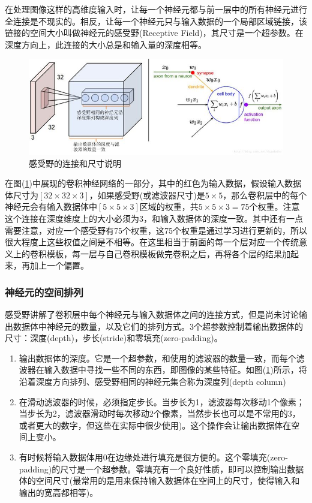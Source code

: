 \documentclass[UTF-8, a4paper, 12pt]{ctexart}
\begin{document}
在处理图像这样的高维度输入时，让每一个神经元都与前一层中的所有神经元进行全连接是不现实的。相反，让每一个神经元只与输入数据的一个局部区域链接，该链接的空间大小叫做神经元的感受野(Receptive Field)，其尺寸是一个超参数。在深度方向上，此连接的大小总是和输入量的深度相等。

\begin{figure}[htbp]
    \centering
    \includegraphics[width=15cm]{fig/f2.jpg}
    \caption{感受野的连接和尺寸说明}
    \label{f2}
\end{figure}

在图(\ref{f2})中展现的卷积神经网络的一部分，其中的红色为输入数据，假设输入数据体尺寸为$[32\times 32\times 3]$，如果感受野(或滤波器尺寸)是$5\times 5$，那么卷积层中的每个神经元会有输入数据体中$[5\times 5\times 3]$区域的权重，$共5\times 5\times 3=75$个权重。注意这个连接在深度维度上的大小必须为3，和输入数据体的深度一致。其中还有一点需要注意，对应一个感受野有75个权重，这75个权重是通过学习进行更新的，所以很大程度上这些权值之间是不相等。在这里相当于前面的每一个层对应一个传统意义上的卷积模板，每一层与自己卷积模板做完卷积之后，再将各个层的结果加起来，再加上一个偏置。

\subsubsection{神经元的空间排列}

感受野讲解了卷积层中每个神经元与输入数据体之间的连接方式，但是尚未讨论输出数据体中神经元的数量，以及它们的排列方式。3个超参数控制着输出数据体的尺寸：深度(depth)，步长(stride)和零填充(zero-padding)。

\begin{enumerate}
    \item 输出数据体的深度。它是一个超参数，和使用的滤波器的数量一致，而每个滤波器在输入数据中寻找一些不同的东西，即图像的某些特征。如图(\ref{f2})所示，将沿着深度方向排列、感受野相同的神经元集合称为深度列(depth column)
    \item 在滑动滤波器的时候，必须指定步长。当步长为1，滤波器每次移动1个像素；当步长为2，滤波器滑动时每次移动2个像素，当然步长也可以是不常用的3，或者更大的数字，但这些在实际中很少使用)。这个操作会让输出数据体在空间上变小。
    \item 有时候将输入数据体用0在边缘处进行填充是很方便的。这个零填充(zero-padding)的尺寸是一个超参数。零填充有一个良好性质，即可以控制输出数据体的空间尺寸(最常用的是用来保持输入数据体在空间上的尺寸，使得输入和输出的宽高都相等)。
\end{enumerate}
\end{document}
